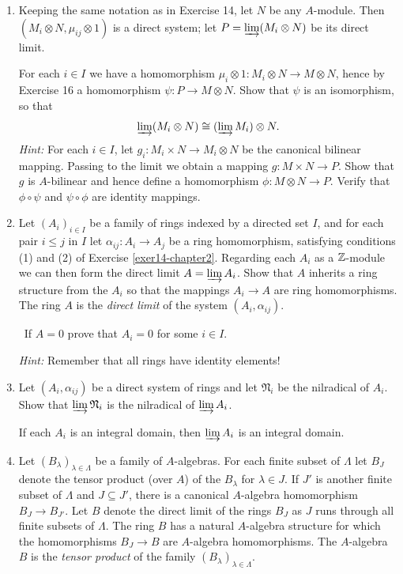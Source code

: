 \begin{enumerate}
    \emph{Tensor products commute with direct limits.} 

    \item \label{exer20-chapter2}Keeping the same notation as in Exercise 14, let $N$ be any $A$-module. Then $(M_i \otimes N, \mu_{ij} \otimes 1)$ is a direct system; let $P = \varinjlim (M_i \otimes N)$ be its direct limit.
    
    For each $i \in I$ we have a homomorphism $\mu_i \otimes 1 \colon M_i \otimes N \to M \otimes N$, hence by Exercise 16 a homomorphism $\psi \colon P \to M \otimes N$. Show that $\psi$ is an isomorphism, so that
    \[
    \varinjlim (M_i \otimes N) \cong (\varinjlim M_i) \otimes N.
    \]
    \textit{Hint:} For each $i \in I$, let $g_i \colon M_i \times N \to M_i \otimes N$ be the canonical bilinear mapping. Passing to the limit we obtain a mapping $g \colon M \times N \to P$. Show that $g$ is $A$-bilinear and hence define a homomorphism $\phi \colon M \otimes N \to P$. Verify that $\phi \circ \psi$ and $\psi \circ \phi$ are identity mappings.

    \item \label{exer21-chapter2}Let $(A_i)_{i \in I}$ be a family of rings indexed by a directed set $I$, and for each pair $i \leq j$ in $I$ let $\alpha_{ij} \colon A_i \to A_j$ be a ring homomorphism, satisfying conditions (1) and (2) of Exercise \ref{exer14-chapter2}. Regarding each $A_i$ as a $\mathbb{Z}$-module we can then form the direct limit $A = \varinjlim A_i$. Show that $A$ inherits a ring structure from the $A_i$ so that the mappings $A_i \to A$ are ring homomorphisms. The ring $A$ is the \emph{direct limit} of the system $(A_i, \alpha_{ij})$.
    
    \quad\, If $A = 0$ prove that $A_i = 0$ for some $i \in I$.

    \textit{Hint:} Remember that all rings have identity elements!

    \item \label{exer22-chapter2}Let $(A_i, \alpha_{ij})$ be a direct system of rings and let $\mathfrak{N}_i$ be the nilradical of $A_i$. Show that $\varinjlim \mathfrak{N}_i$ is the nilradical of $\varinjlim A_i$.
    
    If each $A_i$ is an integral domain, then $\varinjlim A_i$ is an integral domain.

    \item \label{exer23-chapter2}Let $(B_\lambda)_{\lambda \in \Lambda}$ be a family of $A$-algebras. For each finite subset of $\Lambda$ let $B_J$ denote the tensor product (over $A$) of the $B_\lambda$ for $\lambda \in J$. If $J'$ is another finite subset of $\Lambda$ and $J \subseteq J'$, there is a canonical $A$-algebra homomorphism $B_J \to B_{J'}$. Let $B$ denote the direct limit of the rings $B_J$ as $J$ runs through all finite subsets of $\Lambda$. The ring $B$ has a natural $A$-algebra structure for which the homomorphisms $B_J \to B$ are $A$-algebra homomorphisms. The $A$-algebra $B$ is the \emph{tensor product} of the family $(B_\lambda)_{\lambda \in \Lambda}$.


\end{enumerate}
